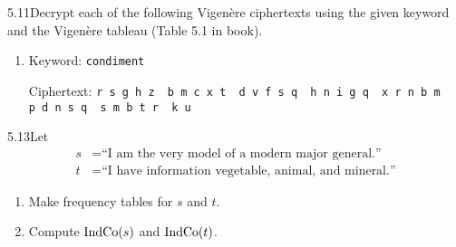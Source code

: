 \begin{exercise}
    {5.11}Decrypt each of the following Vigen\`ere ciphertexts using the given keyword and the Vigen\`ere tableau (Table 5.1 in book).
    \begin{enumerate}
        \item Keyword: \texttt{condiment}
              \vspace*{-0.8em}
              \begin{tabbing}
                  Ciphertext: \= \texttt{r s g h z \ b m c x t \ d v f s q \ h n i g q \ x r n b m} \\
                  \> \texttt{p d n s q \ s m b t r \ k u}
              \end{tabbing}
    \end{enumerate}
\end{exercise}

\begin{exercise}
    {5.13}Let
    \begin{align*}
        s & = \text{``I am the very model of a modern major general.''}     \\
        t & = \text{``I have information vegetable, animal, and mineral.''}
    \end{align*}
    \begin{enumerate}
        \item Make frequency tables for \(s\) and \(t\).
        \item Compute \(\text{IndCo}(s)\) and \(\text{IndCo}(t)\).
    \end{enumerate}
\end{exercise}

